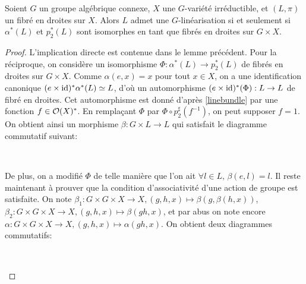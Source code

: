 \begin{lem}\label{existenceGLin}
Soient $G$ un groupe algébrique connexe, $X$ une $G$-variété irréductible, et $(L,\pi)$ un fibré en droites sur $X$. Alors $L$ admet une $G$-linéarisation si et seulement si $\alpha^*(L)$ et $p_2^*(L)$ sont isomorphes en tant que fibrés en droites sur $G\times X$.
\end{lem}
\begin{proof}
L'implication directe est contenue dans le lemme précédent. Pour la réciproque, on considère un isomorphisme $\Phi:\alpha^*(L)\rightarrow p_2^*(L)$ de fibrés en droites sur $G\times X$. Comme $\alpha(e,x)=x$ pour tout $x\in X$, on a une identification canonique $(e\times \operatorname{id})^*\alpha^*(L)\simeq L$, d'où un automorphisme $(e\times \operatorname{id})^*(\Phi):L\rightarrow L$ de fibré en droites. Cet automorphisme est donné d'après \ref{linebundle} par une fonction $f\in \mathcal{O}(X)^*$. En remplaçant $\Phi$ par $\Phi\circ p_2^\sharp(f^{-1})$, on peut supposer $f=1$. On obtient ainsi un morphisme  $\beta: G\times L \rightarrow L$ qui satisfait le diagramme commutatif suivant:
	\begin{center}
	\\
	\end{center}
De plus, on a modifié $\Phi$ de telle manière que l'on ait $\forall l\in L,\,\beta(e,l)=l$. Il reste maintenant à prouver que la condition d'associativité d'une action de groupe est satisfaite. On note $\beta_1:G\times G\times X\rightarrow X, (g,h,x)\mapsto \beta(g,\beta(h, x))$, $\beta_2:G\times G\times X\rightarrow X, (g,h,x)\mapsto \beta(gh, x)$, et par abus on note encore $\alpha:G\times G\times X\rightarrow X, (g,h,x)\mapsto \alpha(gh, x)$. On obtient deux diagrammes commutatifs:
	\begin{center}
	\,\,\,\,\,\,\,\,\,\,\,\,
\end{center}
\end{proof}
